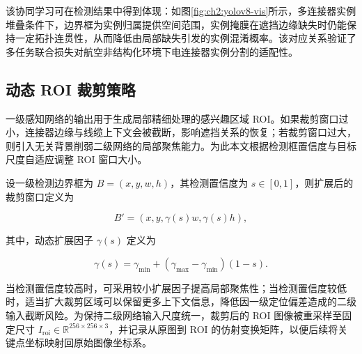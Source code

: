 该协同学习可在检测结果中得到体现：如图\ref{fig:ch2:yolov8-vis}所示，多连接器实例堆叠条件下，边界框为实例归属提供空间范围，实例掩膜在遮挡边缘缺失时仍能保持一定拓扑连贯性，从而降低由局部缺失引发的实例混淆概率。该对应关系验证了多任务联合损失对航空非结构化环境下电连接器实例分割的适配性。

\subsection{动态 ROI 裁剪策略}
一级感知网络的输出用于生成局部精细处理的感兴趣区域 ROI。如果裁剪窗口过小，连接器边缘与线缆上下文会被截断，影响遮挡关系的恢复；若裁剪窗口过大，则引入无关背景削弱二级网络的局部聚焦能力。为此本文根据检测框置信度与目标尺度自适应调整 ROI 窗口大小。

设一级检测边界框为 \(B=(x,y,w,h)\)，其检测置信度为 \(s\in[0,1]\)，则扩展后的裁剪窗口定义为

$$
B'=(x,y,\gamma(s)w,\gamma(s)h),
$$

其中，动态扩展因子 \(\gamma(s)\) 定义为

$$
\gamma(s)=\gamma_{\min}+(\gamma_{\max}-\gamma_{\min})(1-s).
$$

当检测置信度较高时，可采用较小扩展因子提高局部聚焦性；当检测置信度较低时，适当扩大裁剪区域可以保留更多上下文信息，降低因一级定位偏差造成的二级输入截断风险。为保持二级网络输入尺度统一，裁剪后的 ROI 图像被重采样至固定尺寸 \(I_{\mathrm{roi}}\in\mathbb{R}^{256\times 256\times 3}\)，并记录从原图到 ROI 的仿射变换矩阵，以便后续将关键点坐标映射回原始图像坐标系。

